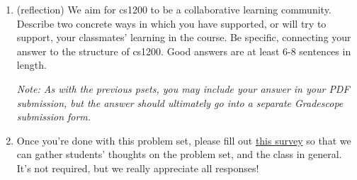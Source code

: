 \documentclass[11pt]{report}
\begin{document}
\begin{enumerate}
\begin{enumerate}
    \end{enumerate}
    
    \emph{Food for thought (do read - it's an important take-away from this problem):} This problem concerns size-augmented binary search trees. In lecture, we discussed AVL trees, which are balanced binary search trees where every vertex contains an additional \textit{height} attribute containing the length of the longest path from the vertex to a leaf (height-augmented). Additionally, every pair of siblings in the tree have heights differing by at most 1, so the tree is height-balanced. Note that if we augment a binary search tree both by size (as in the above problem) and by height (and use it to maintain the AVL property), then we create a dynamic data structure able to perform \texttt{search}, \texttt{insert}, and \texttt{select} all in time $O(\log n)$. 


\item (reflection) We aim for cs1200 to be a collaborative learning community. Describe two concrete ways in which you have supported, or will try to support, your classmates' learning in the course.  Be specific, connecting your answer to the structure of cs1200. Good answers are at least 6-8 sentences in length.

\textit{Note: As with the previous psets, you may include your answer in your PDF submission, but the answer should ultimately go into a separate Gradescope submission form.}



\item Once you're done with this problem set, please fill out \href{https://forms.gle/wwedZAhPduqzHQ9d8}{this survey} so that we can gather students' thoughts on the problem set, and the class in general. It's not required, but we really appreciate all responses!

\end{enumerate}
\end{document}
